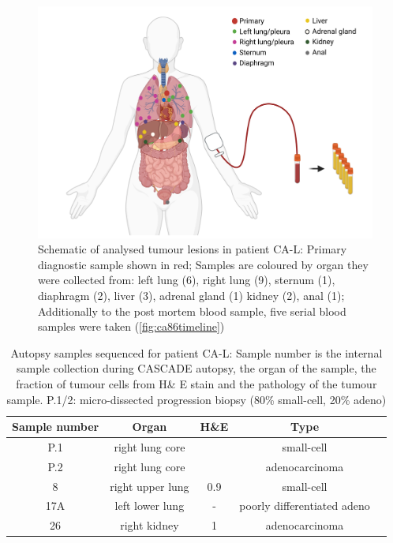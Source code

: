 \begin{figure}[htp]
\centering
\includegraphics[width=.99\linewidth]{Figures/CASCADE/CA86/CA-L_schematic_CA86_organColours}
\caption[Schematic of analysed tumour lesions in patient CA-L]{Schematic of analysed tumour lesions in patient CA-L: Primary diagnostic sample shown in red; Samples are coloured by organ they were collected from: left lung (6), right lung (9), sternum (1), diaphragm (2), liver (3), adrenal gland (1) kidney (2), anal (1); Additionally to the post mortem blood sample, five serial blood samples were taken (\protect\autoref{fig:ca86timeline})} \label{fig:ca86schematic}
\end{figure}

\begin{table}[ht]
\caption[Autopsy samples sequenced for patient CA-L]{Autopsy samples sequenced for patient CA-L: Sample number is the internal sample collection during CASCADE autopsy, the organ of the sample, the fraction of tumour cells from H\& E stain and the pathology of the tumour sample. P.1/2: micro-dissected progression biopsy (80\% small-cell, 20\% adeno)}\label{tab:ca86wesSamples}
\centering
{}
\begin{tabular}{|c|c|c|c|c|}
\toprule
\hline
 \rowcolor{gray!50}
\textbf{Sample number} & \textbf{Organ} & \textbf{H\&E} & \textbf{Type}\\
\hline
 P.1 & right lung core & \cellcolor{gray!15} & small-cell \\
 P.2 & right lung core & \cellcolor{gray!15}\multirow{-2}{*}{>0.9} & adenocarcinoma \\
 8 & right upper lung & 0.9 & small-cell \\
 17A & left lower lung & - & poorly differentiated adeno \\
 26 & right kidney & 1 & adenocarcinoma \\
 \hline
\bottomrule
\end{tabular}
\end{table} 

